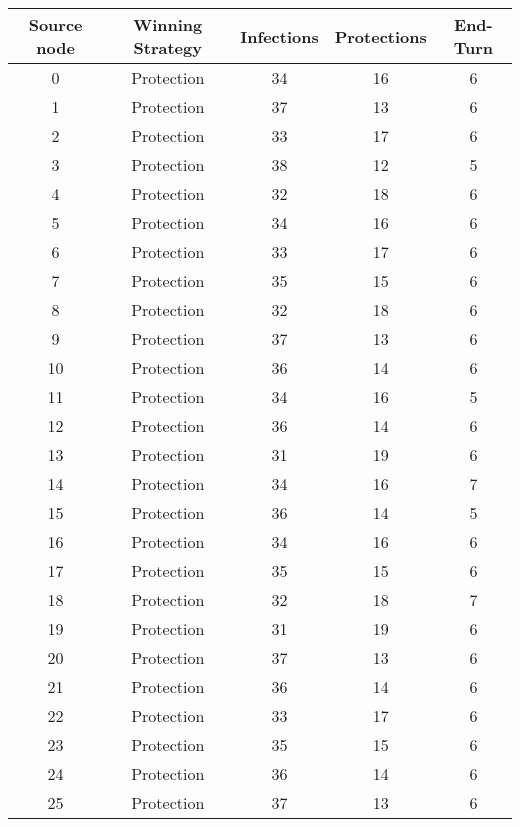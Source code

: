 \documentclass[results.tex]{subfiles}
\begin{document}
\begin{center}
  \begin{tabular}{| c || c | c | c | c |}
    \hline
    {\bfseries Source node} & {\bfseries Winning Strategy} & {\bfseries Infections} & {\bfseries Protections} & {\bfseries End-Turn} \\  %
    \hline\hline
    0 & Protection & 34 & 16 & 6 \\ 
    \hline
    1 & Protection & 37 & 13 & 6 \\ 
    \hline
    2 & Protection & 33 & 17 & 6 \\ 
    \hline
    3 & Protection & 38 & 12 & 5 \\ 
    \hline
    4 & Protection & 32 & 18 & 6 \\ 
    \hline
    5 & Protection & 34 & 16 & 6 \\ 
    \hline
    6 & Protection & 33 & 17 & 6 \\ 
    \hline
    7 & Protection & 35 & 15 & 6 \\ 
    \hline
    8 & Protection & 32 & 18 & 6 \\ 
    \hline
    9 & Protection & 37 & 13 & 6 \\ 
    \hline
    10 & Protection & 36 & 14 & 6 \\ 
    \hline
    11 & Protection & 34 & 16 & 5 \\ 
    \hline
    12 & Protection & 36 & 14 & 6 \\ 
    \hline
    13 & Protection & 31 & 19 & 6 \\ 
    \hline
    14 & Protection & 34 & 16 & 7 \\ 
    \hline
    15 & Protection & 36 & 14 & 5 \\ 
    \hline
    16 & Protection & 34 & 16 & 6 \\ 
    \hline
    17 & Protection & 35 & 15 & 6 \\ 
    \hline
    18 & Protection & 32 & 18 & 7 \\ 
    \hline
    19 & Protection & 31 & 19 & 6 \\ 
    \hline
    20 & Protection & 37 & 13 & 6 \\ 
    \hline
    21 & Protection & 36 & 14 & 6 \\ 
    \hline
    22 & Protection & 33 & 17 & 6 \\ 
    \hline
    23 & Protection & 35 & 15 & 6 \\ 
    \hline
    24 & Protection & 36 & 14 & 6 \\ 
    \hline
    25 & Protection & 37 & 13 & 6 \\ 

\end{tabular}
\end{center}
\end{document}
